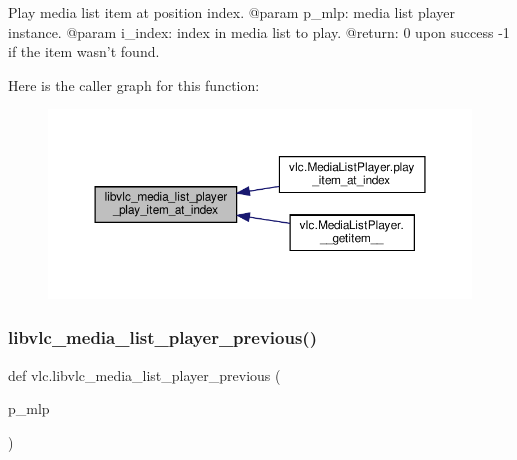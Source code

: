 \begin{DoxyVerb}Play media list item at position index.
@param p_mlp: media list player instance.
@param i_index: index in media list to play.
@return: 0 upon success -1 if the item wasn't found.
\end{DoxyVerb}
 Here is the caller graph for this function\+:
\nopagebreak
\begin{figure}[H]
\begin{center}
\leavevmode
\includegraphics[width=350pt]{namespacevlc_a460c1773285fe9fed9795e86e8039c0d_icgraph}
\end{center}
\end{figure}
\mbox{\label{namespacevlc_a528f3b4e34c0d8591691fb2f4aaf2aff}} 
\subsubsection{\texorpdfstring{libvlc\+\_\+media\+\_\+list\+\_\+player\+\_\+previous()}{libvlc\_media\_list\_player\_previous()}}
{\footnotesize\ttfamily def vlc.\+libvlc\+\_\+media\+\_\+list\+\_\+player\+\_\+previous (\begin{DoxyParamCaption}\item[{}]{p\+\_\+mlp }\end{DoxyParamCaption})}

